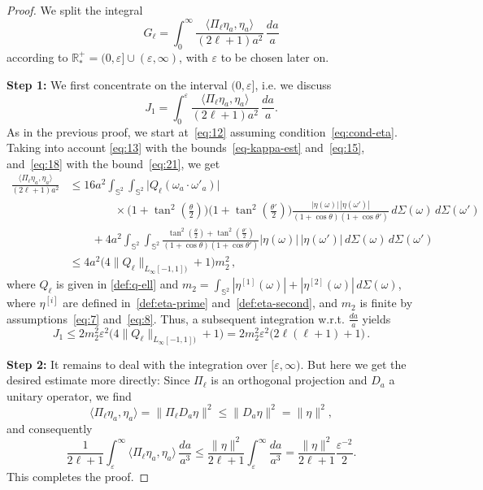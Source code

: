 \documentclass[a4paper,11pt,DIV=11,%
abstract=on%
]{scrartcl}
\def\R{{\mathbb R}}
\newcommand{\red}[1]{#1}
\newcommand{\blue}[1]{#1}
\begin{document}
\begin{proof}
  We split the integral \red{
      \begin{equation}
G_\ell=\int_0^{\infty}\frac{\langle\Pi_\ell\eta_a,\eta_a\rangle}{(2\ell+1)a^2}
	\,\frac{da}{a}\label{eq:17}      
      \end{equation}}
according to $\R_*^+=(0,\varepsilon]\cup(\varepsilon,\infty)$, with
	$\varepsilon$ to be chosen later on.
	
	\textbf{Step 1:} We first concentrate on the interval $(0,\varepsilon]$, i.e. we discuss
	$$J_1=\int_0^\varepsilon\frac{\langle\Pi_\ell\eta_a,\eta_a\rangle}{(2\ell+1)a^2}
	\,\frac{da}{a}.$$
\red{As in the previous proof, we start \blue{at}~\eqref{eq:12} assuming
  condition~\eqref{eq:cond-eta}. Taking into 
  account \eqref{eq:13} with the bounds~\eqref{eq-kappa-est} and~\eqref{eq:15}, and~\eqref{eq:18}
  with the bound~\eqref{eq:21}, we get }
	\begin{align*}
		\frac{\langle\Pi_\ell\eta_a,\eta_a\rangle}{(2\ell+1)a^2}
		&\leq 16a^2
		\int_{\mathbb S^2}\int_{\mathbb S^2}\bigl|Q_\ell(\omega_a \cdot \omega'_a)\bigr|\\
		&\qquad\qquad\times\bigl(1+\tan^2(\tfrac{\theta}{2})\bigr)
		\bigl(1+\tan^2(\tfrac{\theta'}{2})\bigr)
		\frac{|\eta(\omega)|\,|\eta(\omega')|}{(1+\cos\theta)(1+\cos\theta')}\,d\Sigma(\omega)\,d\Sigma(\omega')\\
		&\qquad +4a^2\int_{\mathbb S^2}\int_{\mathbb S^2}
		\frac{\tan^2(\tfrac{\theta}{2})+\tan^2(\tfrac{\theta'}{2})}{(1+\cos\theta)(1+\cos\theta')}
		|\eta(\omega)|\,|\eta(\omega')|\,d\Sigma(\omega)\,d\Sigma(\omega')\\
		&\leq 
		4a^2\bigl(4\|Q_\ell\|_{L_\infty[-1,1])} +1\bigr)m_2^2\,,
	\end{align*}
	where $Q_\ell$ is given in \eqref{def:q-ell} and 
	$
	m_2=\int_{\mathbb S^2} \red{|\eta^{[1]}(\omega)| + |\eta^{[2]}(\omega)|}\,d\Sigma(\omega)
	$, \red{where $\eta^{[i]}$ are defined
          in~\eqref{def:eta-prime} and~\eqref{def:eta-second}, and
          $m_2$ is finite by assumptions~\eqref{eq:7} and~\eqref{eq:8}.}
	Thus, a subsequent integration w.r.t. $\frac{da}{a}$ yields
	$$J_1\leq 2m_2^2\varepsilon^2\bigl(4\|Q_\ell\|_{L_\infty[-1,1])}+1\bigr)
	=2m_2^2\varepsilon^2\bigl(2\ell(\ell+1)+1\bigr)\,.$$
	
	\textbf{Step 2:} It remains to deal with the integration over $[\varepsilon,\infty)$. But here we
	get the desired estimate more directly: Since $\Pi_\ell$ is an orthogonal projection
	and $D_a$ a unitary operator, we find
	$$\langle\Pi_\ell\eta_a,\eta_a\rangle
	=\|\Pi_\ell D_a\eta\|^2
	\leq\|D_a\eta\|^2=\|\eta\|^2,$$
	and consequently
        \begin{equation}
\frac{1}{2\ell +1}\int_{\varepsilon}^{\infty}
		\langle \Pi_{\ell} \eta_a , \eta_a \rangle\,\frac{da}{a^3}
		\leq\frac{\|\eta\|^2}{2\ell +1}
		\int_{\varepsilon}^{\infty} \frac{da}{a^3}
		=
                \frac{\|\eta\|^2}{2\ell+1}\frac{\varepsilon^{-2}}{2}.\label{eq:16}             
              \end{equation}
	This completes the proof.
\end{proof}
\end{document}
